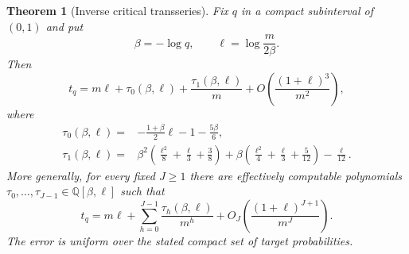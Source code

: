 \documentclass[11pt,letterpaper]{article}
\numberwithin{equation}{subsection}
\newtheorem{theorem}{Theorem}[subsection]
\theoremstyle{definition}
\theoremstyle{remark}
\theoremstyle{plain}
\begin{document}
\begin{theorem}[Inverse critical transseries]\label{a122:pd:thm:inverse}
Fix $q$ in a compact subinterval of $(0,1)$ and put
\begin{equation}\label{a122:pd:eq:betaell}
 \beta=-\log q,\qquad \ell=\log\frac{m}{2\beta}.
\end{equation}
Then
\begin{equation}\label{a122:pd:eq:inverse2}
 t_q=m\ell+\tau_0(\beta,\ell)+\frac{\tau_1(\beta,\ell)}m
 +O\!\left(\frac{(1+\ell)^3}{m^2}\right),
\end{equation}
where
\begin{align}
 \tau_0(\beta,\ell)={}&-\frac{1+\beta}{2}\ell-1-\frac{5\beta}{6},
 \label{a122:pd:eq:d0}\\
 \tau_1(\beta,\ell)={}&
 \beta^2\left(\frac{\ell^2}{8}+\frac\ell3+\frac38\right)
 +\beta\left(\frac{\ell^2}{4}+\frac\ell3+\frac5{12}\right)
 -\frac\ell{12}.\label{a122:pd:eq:d1}
\end{align}
More generally, for every fixed $J\ge1$ there are effectively
computable polynomials $\tau_0,\ldots,\tau_{J-1}\in\mathbb Q[\beta,\ell]$
such that
\begin{equation}\label{a122:pd:eq:inverseall}
 t_q=m\ell+\sum_{h=0}^{J-1}\frac{\tau_h(\beta,\ell)}{m^h}
 +O_J\!\left(\frac{(1+\ell)^{J+1}}{m^J}\right).
\end{equation}
The error is uniform over the stated compact set of target probabilities.
\end{theorem}
\end{document}
